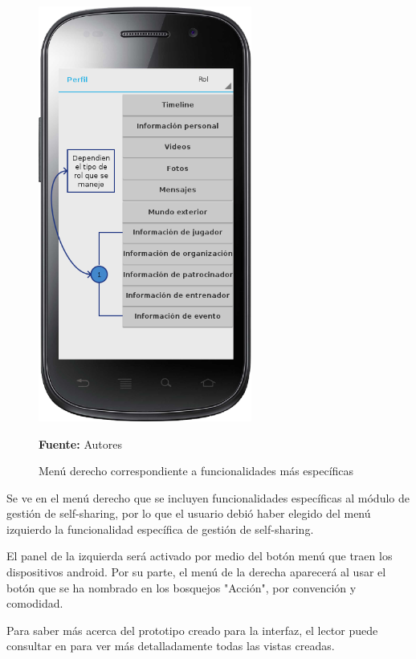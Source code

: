 \begin{figure}[!htb]
  \begin{center}
    \includegraphics[width=7cm]{./imagenes/UI/Self_sharing/self_sharing_2.png}
    \caption{Menú derecho correspondiente a funcionalidades más específicas}
    \label{fig:ui_ejemplo_2}
    \textbf{Fuente:}  Autores
  \end{center}
\end{figure}

Se ve en el menú derecho que se incluyen funcionalidades específicas al módulo de gestión de self-sharing, por lo que el usuario debió haber elegido del menú izquierdo la funcionalidad específica de gestión de self-sharing.

El panel de la izquierda será activado por medio del botón menú que traen los dispositivos android. Por su parte, el menú de la derecha aparecerá al usar el botón que se ha nombrado en los bosquejos "Acción", por convención y comodidad.

Para saber más acerca del prototipo creado para la interfaz, el lector puede consultar en \cite{anexos_tesis} para ver más detalladamente todas las vistas creadas.